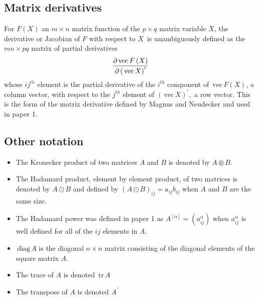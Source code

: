 \documentclass[12pt,thmsa,suthesis,verbatim]{report}
\begin{document}
\subsection{Matrix derivatives}

For $F\left( X\right) $ an $m\times n$ matrix function of the $p\times q$
matrix variable $X$, the derivative or Jacobian of $F$ with respect to $X\,$
is unambiguously defined as the $mn\times pq$ matrix of partial derivatives 
\begin{equation}
\frac{\partial \,\mathrm{vec}\,F\left( X\right) }{\partial \left( \,\mathrm{%
vec}\,X\right) ^{\prime }}  \label{derdef}
\end{equation}
whose $ij^{th}$ element is the partial derivative of the $i^{th}$ component
of $\,\mathrm{vec}\,F\left( X\right) $, a column vector, with respect to the 
$j^{th}$ element of $\left( \,\mathrm{vec}\,X\right) ^{\prime },$ a row
vector. This is the form of the matrix derivative defined by Magnus and
Neudecker\cite{MagNeud88} and used in paper 1.

\subsection{Other notation}

\begin{itemize}
\item  The Kronecker product of two matrices $A$ and $B$ is denoted by $%
A\otimes B.$

\item  The Hadamard product, element by element product, of two matrices is
denoted by $A\odot B$ and defined by $\left( A\odot B\right)
_{ij}=a_{ij}b_{ij}$ when $A$ and $B$ are the same size.

\item  The Hadamard power was defined in paper 1 as $A^{\left[ \alpha
\right] }=\left( a_{ij}^\alpha \right) $ when $a_{ij}^\alpha $ is well
defined for all of the $ij$ elements in $A.$

\item  $\,\mathrm{diag}\,A$ is the diagonal $n\times n$ matrix consisting of
the diagonal elements of the square matrix $A.$

\item  The trace of $A$ is denoted $\,\mathrm{tr}\,A$

\item  The transpose of $A$ is denoted $A^{\prime }$
\end{itemize}
\end{document}
